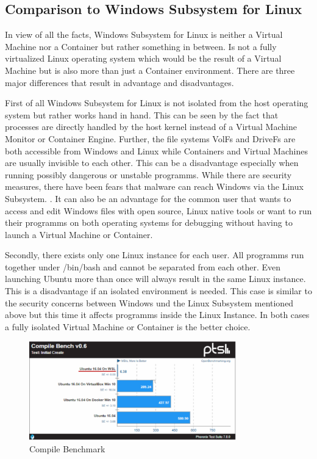 \documentclass[utf8,biblatex, ngerman, english]{lni}
\begin{document}
\subsection{Comparison to Windows Subsystem for Linux}

In view of all the facts, Windows Subsystem for Linux is neither a Virtual Machine nor a Container but rather something in between. Is not a fully virtualized Linux operating system which would be the result of a Virtual Machine but is also more than just a Container environment. There are three major differences that result in advantage and disadvantages. 

First of all Windows Subsystem for Linux is not isolated from the host operating system but rather works hand in hand. This can be seen by the fact that processes are directly handled by the host kernel instead of a Virtual Machine Monitor or Container Engine. Further, the file systems VolFs and DriveFs are both accessible from Windows and Linux while Containers and Virtual Machines are usually invisible to each other. This can be a disadvantage especially when running possibly dangerous or unstable programms. While there are security measures, there have been fears that malware can reach Windows via the Linux Subsystem. \cite{Wh17}. It can also be an advantage for the common user that wants to access and edit Windows files with open source, Linux native tools or want to run their programms on both operating systems for debugging without having to launch a Virtual Machine or Container.

Secondly, there exists only one Linux instance for each user. All programms run together under /bin/bash and cannot be separated from each other. Even launching Ubuntu more than once will always result in the same Linux instance\cite{WSL16}. This is a disadvantage if an isolated environment is needed. This case is similar to the security concerns between Windows und the Linux Subsystem mentioned above but this time it affects programms inside the Linux Instance. In both cases a fully isolated Virtual Machine or 
Container is the better choice.

\begin{figure}
  \centering
  \includegraphics[width=0.8\textwidth]{CompileSpeed.pdf}
  \caption{Compile Benchmark} %
  \label{img:speed}
\end{figure}
\end{document}
